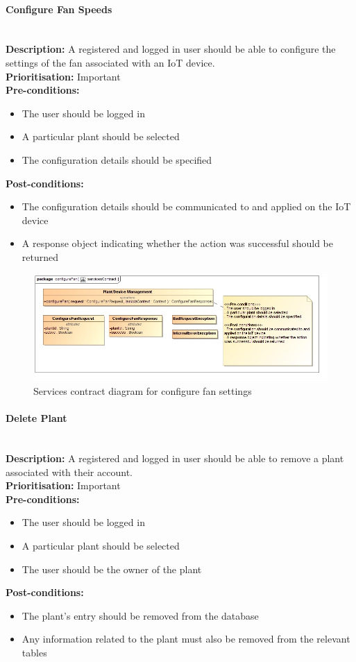 \documentclass{article}
\begin{document}
\paragraph{Configure Fan Speeds}\mbox{}\\
\textbf{Description:} A registered and logged in user should be able to configure the settings of the fan associated with an IoT device.\\
\textbf{Prioritisation:} Important\\		
\textbf{Pre-conditions:}
\begin{itemize}
	\item The user should be logged in
	\item A particular plant should be selected
	\item The configuration details should be specified
\end{itemize}
\textbf{Post-conditions:}
\begin{itemize}
	\item The configuration details should be communicated to and applied on the IoT device
	\item A response object indicating whether the action was successful should be returned
\end{itemize}

\begin{figure}[H]
	\includegraphics[width=\linewidth]{images/ServicesContracts/configureFan.jpg}
	\caption{Services contract diagram for configure fan settings}
\end{figure}

\paragraph{Delete Plant}\mbox{}\\
\textbf{Description:} A registered and logged in user should be able to remove a plant associated with their account.\\
\textbf{Prioritisation:} Important\\		
\textbf{Pre-conditions:}
\begin{itemize}
	\item The user should be logged in
	\item A particular plant should be selected
	\item The user should be the owner of the plant
\end{itemize}
\textbf{Post-conditions:}
\begin{itemize}
	\item The plant's entry should be removed from the database
	\item Any information related to the plant must also be removed from the relevant tables
\end{itemize}
\end{document}
